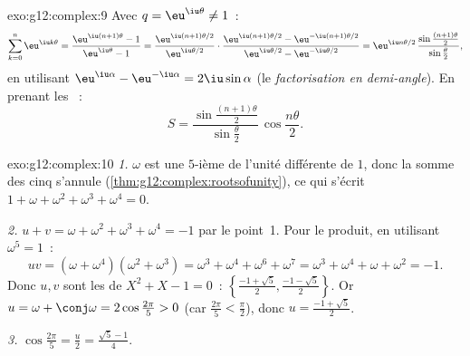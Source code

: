 \begin{solution}{exo:g12:complex:9}
Avec $q = \eu^{\iu\theta} \neq 1$~:
\[
\sum_{k=0}^{n} \eu^{\iu k\theta} = \frac{\eu^{\iu(n+1)\theta} - 1}{\eu^{\iu\theta} - 1}
= \frac{\eu^{\iu(n+1)\theta/2}}{\eu^{\iu\theta/2}}
\cdot\frac{\eu^{\iu(n+1)\theta/2} - \eu^{-\iu(n+1)\theta/2}}{\eu^{\iu\theta/2} - \eu^{-\iu\theta/2}}
= \eu^{\iu n\theta/2}\,
\frac{\sin\frac{(n+1)\theta}{2}}{\sin\frac{\theta}{2}},
\]
en utilisant $\eu^{\iu\alpha} - \eu^{-\iu\alpha} = 2\iu\sin\alpha$ (le
\emph{factorisation en demi-angle}). En prenant les ~:
\[
S = \frac{\sin\frac{(n+1)\theta}{2}}{\sin\frac{\theta}{2}}\,
\cos\frac{n\theta}{2}.
\]
\end{solution}

\begin{solution}{exo:g12:complex:10}
\emph{1.} $\omega$ est une  $5$-ième de l'unité différente de $1$,
donc la somme des cinq  s'annule
(\cref{thm:g12:complex:rootsofunity}), ce qui s'écrit
$1 + \omega + \omega^2 + \omega^3 + \omega^4 = 0$.

\emph{2.} $u + v = \omega + \omega^2 + \omega^3 + \omega^4 = -1$ par le
point~1. Pour le produit, en utilisant $\omega^5 = 1$~:
\[
uv = (\omega + \omega^4)(\omega^2 + \omega^3)
= \omega^3 + \omega^4 + \omega^6 + \omega^7
= \omega^3 + \omega^4 + \omega + \omega^2 = -1 .
\]
Donc $u, v$ sont les  de $X^2 + X - 1 = 0$~:
$\left\{\frac{-1+\sqrt5}{2}, \frac{-1-\sqrt5}{2}\right\}$. Or
$u = \omega + \conj\omega = 2\cos\frac{2\pi}{5} > 0$ (car
$\frac{2\pi}{5} < \frac{\pi}{2}$), donc $u = \frac{-1 + \sqrt5}{2}$.

\emph{3.} $\cos\frac{2\pi}{5} = \frac u2 = \frac{\sqrt5 - 1}{4}$.
\end{solution}

